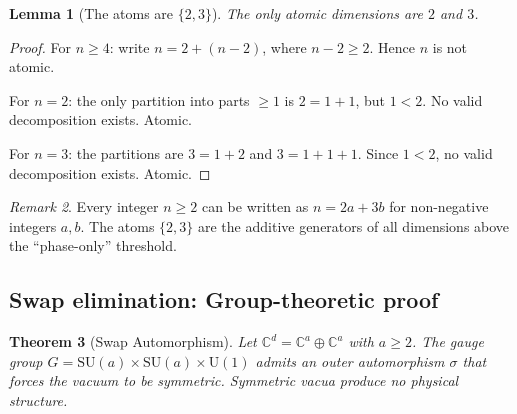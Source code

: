 \documentclass[12pt]{article}
\newtheorem{theorem}{Theorem}[section]
\newtheorem{lemma}[theorem]{Lemma}
\theoremstyle{remark}
\newtheorem{remark}[theorem]{Remark}
\theoremstyle{definition}
\newcommand{\CC}{\mathbb{C}}
\begin{document}
\begin{lemma}[The atoms are $\{2, 3\}$]
\label{lem:atoms}
The only atomic dimensions are $2$ and $3$.
\end{lemma}

\begin{proof}
For $n \geq 4$: write $n = 2 + (n - 2)$, where $n - 2 \geq 2$. Hence $n$ is not atomic.

For $n = 2$: the only partition into parts $\geq 1$ is $2 = 1 + 1$, but $1 < 2$. No valid decomposition exists. Atomic.

For $n = 3$: the partitions are $3 = 1 + 2$ and $3 = 1 + 1 + 1$. Since $1 < 2$, no valid decomposition exists. Atomic.
\end{proof}

\begin{remark}
Every integer $n \geq 2$ can be written as $n = 2a + 3b$ for non-negative integers $a, b$. The atoms $\{2, 3\}$ are the additive generators of all dimensions above the ``phase-only'' threshold.
\end{remark}

\subsection{Swap elimination: Group-theoretic proof}

\begin{theorem}[Swap Automorphism]
\label{thm:swap}
Let $\CC^d = \CC^a \oplus \CC^a$ with $a \geq 2$. The gauge group $G = \text{SU}(a) \times \text{SU}(a) \times \text{U}(1)$ admits an outer automorphism $\sigma$ that forces the vacuum to be symmetric. Symmetric vacua produce no physical structure.
\end{theorem}
\end{document}
